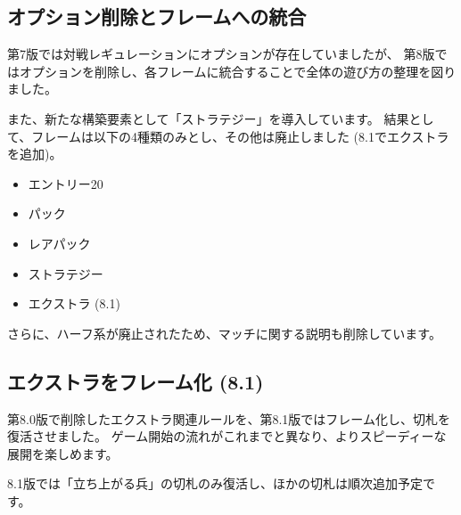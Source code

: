 \documentclass[letterpaper,10pt,dvipdfmx]{sphinxmanual}
\begin{document}
\subsection{オプション削除とフレームへの統合}
\label{\detokenize{revision-history/8th:id6}}
\sphinxAtStartPar
第7版では対戦レギュレーションにオプションが存在していましたが、
第8版ではオプションを削除し、各フレームに統合することで全体の遊び方の整理を図りました。

\sphinxAtStartPar
また、新たな構築要素として「ストラテジー」を導入しています。
結果として、フレームは以下の4種類のみとし、その他は廃止しました (8.1でエクストラを追加)。
\begin{itemize}
\item {} 
\sphinxAtStartPar
エントリー20

\item {} 
\sphinxAtStartPar
パック

\item {} 
\sphinxAtStartPar
レアパック

\item {} 
\sphinxAtStartPar
ストラテジー

\item {} 
\sphinxAtStartPar
エクストラ (8.1)

\end{itemize}

\sphinxAtStartPar
さらに、ハーフ系が廃止されたため、マッチに関する説明も削除しています。


\subsection{エクストラをフレーム化 (8.1)}
\label{\detokenize{revision-history/8th:id7}}
\sphinxAtStartPar
第8.0版で削除したエクストラ関連ルールを、第8.1版ではフレーム化し、切札を復活させました。
ゲーム開始の流れがこれまでと異なり、よりスピーディーな展開を楽しめます。

\sphinxAtStartPar
8.1版では「立ち上がる兵」の切札のみ復活し、ほかの切札は順次追加予定です。
\end{document}
